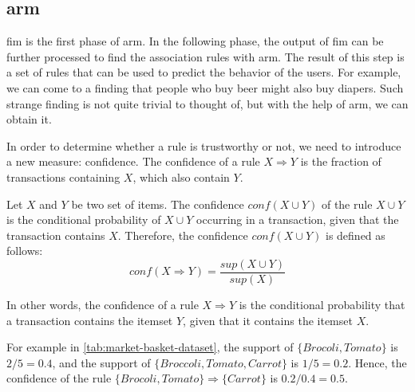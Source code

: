\subsection{\Acl{arm}}
\label{sub:association_rule_mining}
\Ac{fim} is the first phase of \ac{arm}.
In the following phase, the output of \ac{fim} can be further processed to find the association rules with \acl{arm}.
The result of this step is a set of rules that can be used to predict the behavior of the users.
For example, we can come to a finding that people who buy beer might also buy diapers.
Such strange finding is not quite trivial to thought of, but with the help of \acl{arm}, we can obtain it.

In order to determine whether a rule is trustworthy or not, we need to introduce a new measure: confidence.
The confidence of a rule $X \Rightarrow Y$ is the fraction of transactions containing $X$, which also contain $Y$.
\begin{definition}
    Let $X$ and $Y$ be two set of items.
    The confidence $conf(X \cup Y)$ of the rule $X \cup Y$ is the conditional probability of $X \cup Y$ occurring in a transaction, given that the transaction contains $X$.
    Therefore, the confidence $conf(X \cup Y)$ is defined as follows:
    \begin{equation}
        conf(X \Rightarrow Y) = \frac{sup(X \cup Y)}{sup(X)}
    \end{equation}
\end{definition}
In other words, the confidence of a rule $X \Rightarrow Y$ is the conditional probability that a transaction contains the itemset $Y$, given that it contains the itemset $X$.

For example in \autoref{tab:market-basket-dataset}, the support of $\{Brocoli, Tomato\}$ is $2/5=0.4$, and the support of $\{Broccoli, Tomato, Carrot\}$ is $1/5=0.2$.
Hence, the confidence of the rule $\{Brocoli, Tomato\} \Rightarrow \{Carrot\}$ is $0.2 / 0.4 = 0.5$.

